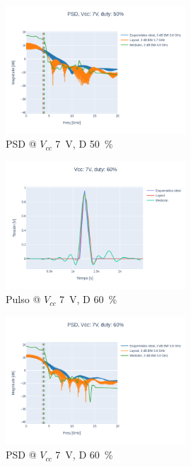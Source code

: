 \begin{figure}
  \centering
    \includegraphics[width=0.6\textwidth]{images/plots/Vcc_7V_duty_50_psd.png}
    \caption{PSD @ $V_{cc}$ \qty{7}{\volt}, D \qty{50}{\percent} }
    \label{fig:psd_7v_50}
\end{figure}

\begin{figure}
  \centering
    \includegraphics[width=0.6\textwidth]{images/plots/Vcc_7V_duty_60_time_domain.png}
    \caption{Pulso @ $V_{cc}$ \qty{7}{\volt}, D \qty{60}{\percent} }
    \label{fig:plots_7v_60}
\end{figure}

\begin{figure}
  \centering
    \includegraphics[width=0.6\textwidth]{images/plots/Vcc_7V_duty_60_psd.png}
    \caption{PSD @ $V_{cc}$ \qty{7}{\volt}, D \qty{60}{\percent} }
    \label{fig:psd_7v_60}
\end{figure}

